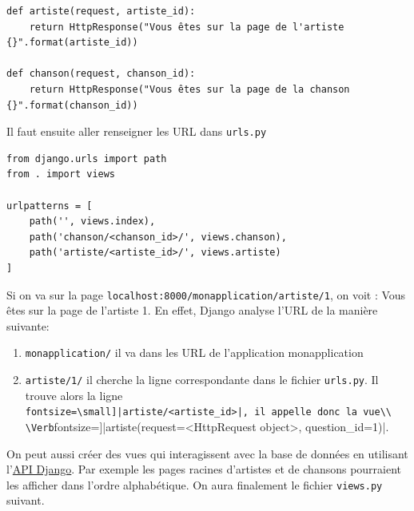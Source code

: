 \documentclass[a4paper, 10pt]{article}
\begin{document}
\begin{verbatim}
def artiste(request, artiste_id):
    return HttpResponse("Vous êtes sur la page de l'artiste {}".format(artiste_id))

def chanson(request, chanson_id):
    return HttpResponse("Vous êtes sur la page de la chanson {}".format(chanson_id))
\end{verbatim}

Il faut ensuite aller renseigner les URL dans \texttt{urls.py}
\begin{verbatim}
from django.urls import path
from . import views

urlpatterns = [
    path('', views.index),
    path('chanson/<chanson_id>/', views.chanson),
    path('artiste/<artiste_id>/', views.artiste)
]
\end{verbatim}

Si on va sur la page \texttt{localhost:8000/monapplication/artiste/1}, on voit : \og Vous êtes sur la page de l'artiste 1\fg{}. En effet, Django analyse l'URL de la manière suivante:
\begin{enumerate}
    \item \texttt{monapplication/} il va dans les URL de l’application monapplication
    \item \texttt{artiste/1/} il cherche la ligne correspondante dans le fichier \texttt{urls.py}. Il trouve alors la ligne\\ \Verb[fontsize=\small]|artiste/<artiste_id>|, il appelle donc la vue\\ \Verb[fontsize=\small]|artiste(request=<HttpRequest object>, question_id=1)|.
\end{enumerate}

On peut aussi créer des vues qui interagissent avec la base de données en utilisant l'\href{https://docs.djangoproject.com/fr/2.0/topics/db/queries/}{API Django}. Par exemple les pages racines d'artistes et de chansons pourraient les afficher dans l'ordre alphabétique. On aura finalement le fichier \texttt{views.py} suivant.
\end{document}
